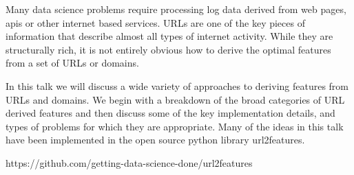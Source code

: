 
Many data science problems require processing log data derived from web pages, apis or other 
internet based services. URLs are one of the key pieces of information that describe almost
all types of internet activity. While they are structurally rich, it is not entirely obvious 
how to derive the optimal features from a set of URLs or domains.

In this talk we will discuss a wide variety of approaches to deriving features from URLs and domains. 
We begin with a breakdown of the broad categories of URL derived features and then discuss some of 
the key implementation details, and types of problems for which they are appropriate.
Many of the ideas in this talk have been implemented in the open source python library url2features. 

https://github.com/getting-data-science-done/url2features


